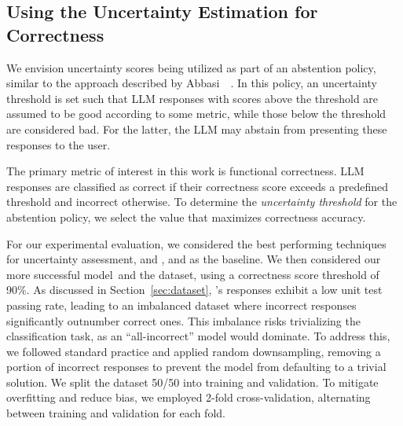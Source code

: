 

\subsection{Using the Uncertainty Estimation for Correctness}
\label{sec:usability}
We envision uncertainty scores being utilized as part of an abstention policy, similar to the approach described by Abbasi~\etal~\cite{abbasi2024believe}.
In this policy, an uncertainty threshold is set such that LLM responses with scores above the threshold are assumed to be good according to some metric, while those below the threshold are considered bad.
For the latter, the LLM may abstain from presenting these responses to the user.

The primary metric of interest in this work is functional correctness. LLM responses are classified as correct if their correctness score exceeds a predefined threshold and incorrect otherwise. To determine the \emph{uncertainty threshold} for the abstention policy, we select the value that maximizes correctness accuracy.

For our experimental evaluation, we considered the best performing techniques for uncertainty assessment, \SESymbolic and \SESymbolicUnif, and \LLMProbability as the baseline.
We then considered our more successful model~\gptturbo and the \livecodebench dataset, using a correctness score threshold of 90\%. 
%
As discussed in Section~\ref{sec:dataset}, \gptturbo's responses exhibit a low unit test passing rate, leading to an imbalanced dataset where incorrect responses significantly outnumber correct ones. This imbalance risks trivializing the classification task, as an ``all-incorrect'' model would dominate. To address this, we followed standard practice and applied random downsampling, removing a portion of incorrect responses to prevent the model from defaulting to a trivial solution. We split the dataset 50/50 into training and validation.
To mitigate overfitting and reduce bias,  we employed 2-fold cross-validation, alternating between training and validation for each fold.

